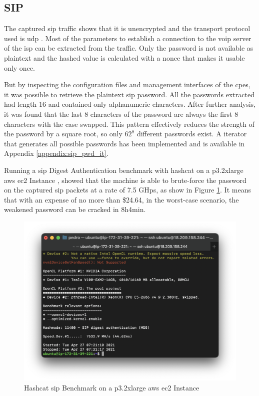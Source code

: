\subsection{SIP}

The captured \gls{sip} traffic shows that it is unencrypted and the transport protocol used is \gls{udp} \cite{rfc768}. Most of the parameters to establish a connection to the \gls{voip} server of the \gls{isp} can be extracted from the traffic. Only the password is not available as plaintext and the hashed value is calculated with a nonce that makes it usable only once.

But by inspecting the configuration files and management interfaces of the \gls{cpe}s, it was possible to retrieve the plaintext \gls{sip} password. All the passwords extracted had length 16 and contained only alphanumeric characters. After further analysis, it was found that the last 8 characters of the password are always the first 8 characters with the case swapped. This pattern effectively reduces the strength of the password by a square root, so only \( 62^8 \) different passwords exist. A iterator that generates all possible passwords has been implemented and is available in Appendix \ref{appendix:sip_pwd_it}.

Running a \gls{sip} Digest Authentication benchmark with hashcat on a p3.2xlarge \gls{aws} \gls{ec2} Instance \cite{aws_ec2_p3_instances}, showed that the machine is able to brute-force the password on the captured \gls{sip} packets at a rate of 7.5 \gls{G}\gls{H}\gls{ps}, as show in Figure \ref{figure:hashcat_benchmark_sip}. It means that with an expense of no more than \$24.64, in the worst-case scenario, the weakened password can be cracked in 8h4min.

\begin{figure}[h]
    \centering
    \includegraphics[width=\linewidth]{contents/configuration-analysis/sip/hashcat-benchmark-sip.png}
    \caption{Hashcat \gls{sip} Benchmark on a p3.2xlarge \gls{aws} \gls{ec2} Instance}
    \label{figure:hashcat_benchmark_sip}
\end{figure}

